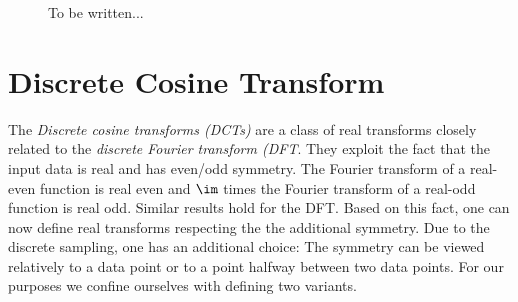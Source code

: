 \begin{figure}[tb]
  \caption{To be written...}
  \label{Basics:Figure:PoissonKernel2}
\end{figure}

\label{Basics:SphericalKernels}

\section{Discrete Cosine Transform}
\label{Basics:DiscreteCosineTransform}

The \emph{Discrete cosine transforms (DCTs)} are a class of real transforms closely related to the 
\emph{discrete Fourier transform (DFT}. They exploit the fact that the 
input data is real and has even/odd symmetry. The Fourier transform of a real-even 
function is real even and $\im$ times the Fourier transform of a real-odd function is real 
odd. Similar results hold for the DFT. Based on this fact, one can now define 
real transforms respecting the the additional symmetry.
Due to the discrete sampling, one has an additional choice: The symmetry can be 
viewed relatively to a data point or to a point halfway between two data points. For our 
purposes we confine ourselves with defining two variants.

